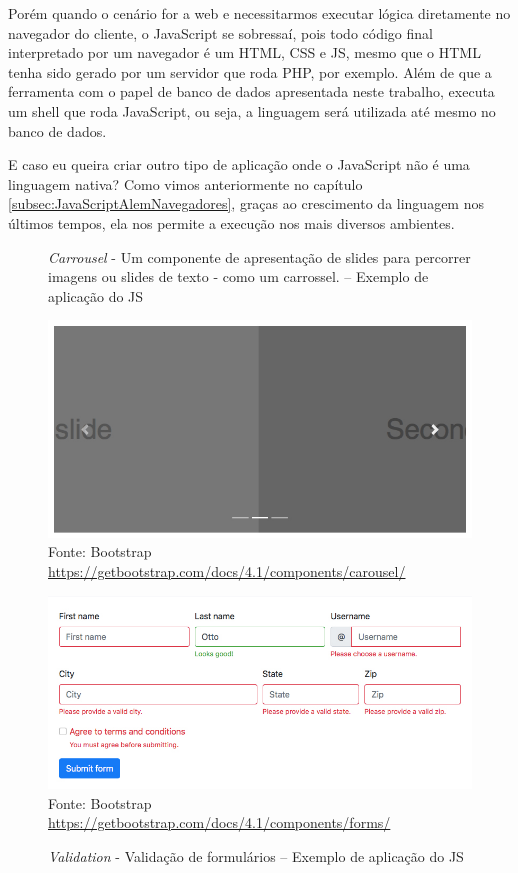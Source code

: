 \documentclass[
	12pt,				%
	openright,			%
	twoside,			%
	a4paper,			%
	english,			%
	brazil				%
	]{abntex2}
\begin{document}
Porém quando o cenário for a web e necessitarmos executar lógica diretamente no navegador do cliente, o JavaScript se sobressaí, pois todo código final interpretado por um navegador é um HTML, CSS e JS, mesmo que o HTML tenha sido gerado por um servidor que roda PHP, por exemplo. Além de que a ferramenta com o papel de banco de dados apresentada neste trabalho, executa um shell que roda JavaScript, ou seja, a linguagem será utilizada até mesmo no banco de dados.

E caso eu queira criar outro tipo de aplicação onde o JavaScript não é uma linguagem nativa? Como vimos anteriormente no capítulo \ref{subsec:JavaScriptAlemNavegadores}, graças ao crescimento da linguagem nos últimos tempos, ela nos permite a execução nos mais diversos ambientes. 

\pagebreak
\begin{figure}[h]
	\centering

	\caption{\textit{Carrousel} - Um componente de apresentação de slides para percorrer imagens ou slides de texto - como um carrossel. -- Exemplo de aplicação do JS} \label{fig:JSExampleCarrousel}
    \includegraphics[scale=0.4]{js-example-carousel} \\
    Fonte: {Bootstrap \url{https://getbootstrap.com/docs/4.1/components/carousel/}}

    \caption{\textit{Validation} - Validação de formulários -- Exemplo de aplicação do JS} \label{fig:JSExampleValidation}
    \includegraphics[scale=0.45]{js-example-validation} \\
    Fonte: {Bootstrap \url{https://getbootstrap.com/docs/4.1/components/forms/}}
	

\end{figure}
\end{document}
